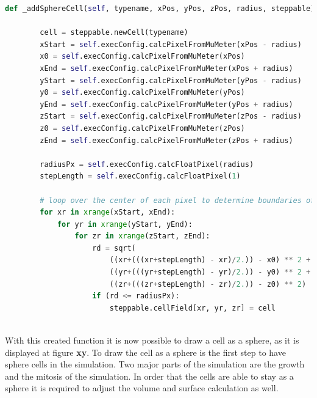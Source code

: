 \begin{lstlisting}[language=Python, caption = Function to draw a cell as a sphere. First all required points for the calculation are converted into the voxel unit. Then over each axis of the cuboid it is iterated. During these iterations for each voxel the distance to the center of the cuboid and sphere is calculated and then it is checked if the voxel is within the sphere or not. If the voxel is a part of the sphere it will be added to the sphere.]
    def _addSphereCell(self, typename, xPos, yPos, zPos, radius, steppable):
    
        cell = steppable.newCell(typename)
        xStart = self.execConfig.calcPixelFromMuMeter(xPos - radius)
        x0 = self.execConfig.calcPixelFromMuMeter(xPos)
        xEnd = self.execConfig.calcPixelFromMuMeter(xPos + radius)
        yStart = self.execConfig.calcPixelFromMuMeter(yPos - radius)
        y0 = self.execConfig.calcPixelFromMuMeter(yPos)
        yEnd = self.execConfig.calcPixelFromMuMeter(yPos + radius)
        zStart = self.execConfig.calcPixelFromMuMeter(zPos - radius)
        z0 = self.execConfig.calcPixelFromMuMeter(zPos)
        zEnd = self.execConfig.calcPixelFromMuMeter(zPos + radius)

        radiusPx = self.execConfig.calcFloatPixel(radius)
        stepLength = self.execConfig.calcFloatPixel(1)
        
        # loop over the center of each pixel to determine boundaries of the circle
        for xr in xrange(xStart, xEnd):
            for yr in xrange(yStart, yEnd):
                for zr in xrange(zStart, zEnd):
                    rd = sqrt(
                        ((xr+(((xr+stepLength) - xr)/2.)) - x0) ** 2 +
                        ((yr+(((yr+stepLength) - yr)/2.)) - y0) ** 2 +
                        ((zr+(((zr+stepLength) - zr)/2.)) - z0) ** 2)
                    if (rd <= radiusPx):
                        steppable.cellField[xr, yr, zr] = cell
                        
\end{lstlisting}

With this created function it is now possible to draw a cell as a sphere, as it is displayed at figure \textbf{xy}. \newline
To draw the cell as a sphere is the first step to have sphere cells in the simulation. Two major parts of the simulation are the growth and the mitosis of the simulation. In order that the cells are able to stay as a sphere it is required to adjust the volume and surface calculation as well.


